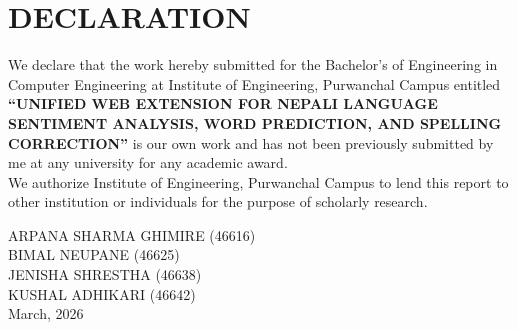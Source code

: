 \chapter*{DECLARATION}
We declare that the work hereby submitted for the Bachelor's of Engineering in Computer Engineering at Institute of Engineering, Purwanchal Campus entitled \textbf{“UNIFIED WEB EXTENSION FOR NEPALI LANGUAGE SENTIMENT ANALYSIS, WORD PREDICTION, AND SPELLING CORRECTION”} is our own work and has not been previously submitted by me at any university for any academic award.\\
We authorize Institute of Engineering, Purwanchal Campus to lend this report to other institution or individuals for the purpose of scholarly research.

ARPANA SHARMA GHIMIRE (46616)\\
BIMAL NEUPANE (46625)\\
JENISHA SHRESTHA (46638)\\
KUSHAL ADHIKARI (46642)\\

March, 2026